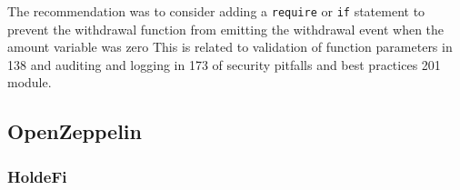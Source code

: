 \begin{itemize}
  The recommendation was to consider adding a \texttt{require} or
  \texttt{if} statement to prevent the withdrawal function from emitting
  the withdrawal event when the amount variable was zero This is related
  to validation of function parameters in 138 and auditing and logging
  in 173 of security pitfalls and best practices 201 module.
\end{itemize}

\subsection{OpenZeppelin}\label{openzeppelin}

\subsubsection{HoldeFi}\label{holdefi}

